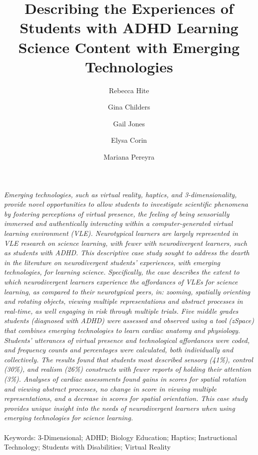 \documentclass[11.5pt]{sig-alternate} %
\makeatletter
\let\oldabstract\abstract
\let\oldendabstract\endabstract
\renewenvironment{abstract}
{\renewenvironment{quotation}%
               {\list{}{\addtolength{\leftmargin}{1em} %
                        \listparindent 1.5em%
                        \itemindent    \listparindent%
                        \rightmargin   \leftmargin%
                        \parsep        \z@ \@plus\p@}%
                \item\relax}%
               {\endlist}%
\oldabstract}
{\oldendabstract}
\makeatother
\begin{document}
\title{Describing the Experiences of Students with ADHD Learning Science Content with Emerging Technologies}

\author[1]{\large \color{blue}Rebecca Hite}
\author[1]{\large \color{blue}Gina Childers}
\author[2]{\large \color{blue}Gail Jones}
\author[3]{\large \color{blue}Elysa Corin}
\author[4]{\large \color{blue}Mariana Pereyra}


\toappear{}
\maketitle
\begin{@twocolumnfalse} 
\begin{abstract}
\item 
\textit {Emerging technologies, such as virtual reality, haptics, and 3-dimensionality, provide novel opportunities to allow students to investigate scientific phenomena by fostering perceptions of virtual presence, the feeling of being sensorially immersed and authentically interacting within a computer-generated virtual learning environment (VLE). Neurotypical learners are largely represented in VLE research on science learning, with fewer with neurodivergent learners, such as students with ADHD. This descriptive case study sought to address the dearth in the literature on neurodivergent students’ experiences, with emerging technologies, for learning science. Specifically, the case describes the extent to which neurodivergent learners experience the affordances of VLEs for science learning, as compared to their neurotypical peers, in: zooming, spatially orienting and rotating objects, viewing multiple representations and abstract processes in real-time, as well engaging in risk through multiple trials. Five middle grades students (diagnosed with ADHD) were assessed and observed using a tool (zSpace) that combines  emerging technologies to learn cardiac anatomy and physiology. Students’ utterances of virtual presence and technological affordances were coded, and frequency counts and percentages were calculated, both individually and collectively. The results found that students most described sensory (41\%), control (30\%), and realism (26\%) constructs with fewer reports of holding their attention (3\%). Analyses of cardiac assessments found gains in scores for spatial rotation and viewing abstract processes, no change in score in viewing multiple representations, and a decrease in scores for spatial orientation. This case study provides unique insight into the needs of neurodivergent learners when using emerging technologies for science learning.}
\\
\\
Keywords: 3-Dimensional; ADHD; Biology Education; Haptics; Instructional Technology; Students with Disabilities; Virtual Reality
\end{abstract}
\end{@twocolumnfalse}
\end{document}
